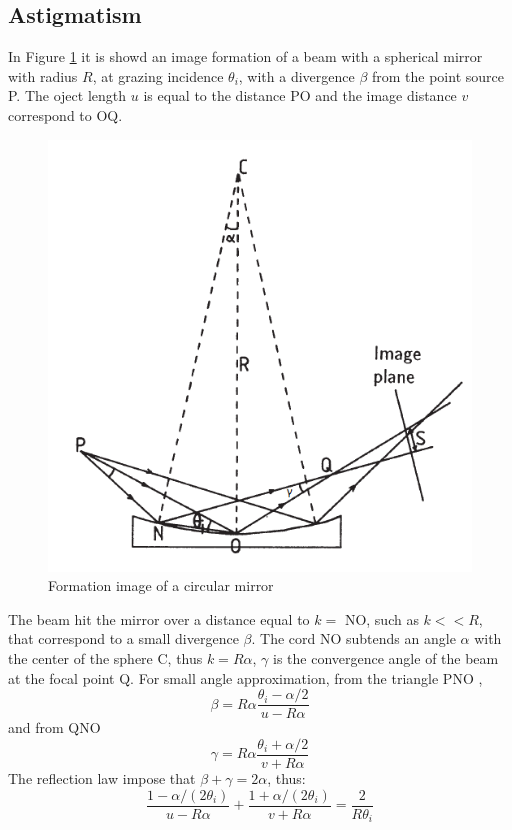 \subsection{Astigmatism}
In Figure \ref{fig: System1} it is showd an image formation of a beam with a spherical mirror with radius $R $, at grazing incidence $\theta_i $, with a divergence $\beta $ from the point source P. The oject length $u $ is equal to the distance PO and the image distance $v $ correspond to OQ.
\begin{figure}[]
%
\centering
%
\includegraphics[width=.6\textwidth]{Immagini/Chapter2/System1}
%
\caption{Formation image of a circular mirror}
%
\label{fig: System1}
%
\end{figure}
\noindent The beam hit the mirror over a distance equal to $k = $ NO, such as $k<<R $, that correspond to a small divergence $\beta $. The cord NO subtends an angle $\alpha $ with the center of the sphere C, thus $k = R \alpha $, $\gamma $ is the convergence angle of the beam at the focal point Q. For small angle approximation, from the triangle PNO ,
\begin{equation}
\beta = R \alpha \frac{\theta_i - \alpha / 2}{u - R \alpha}
\label{eq: beta}
\end{equation}
\noindent and from QNO
\begin{equation}
\gamma = R \alpha \frac{\theta_i + \alpha / 2}{v + R \alpha}
\label{eq: gamme}
\end{equation}
\noindent The reflection law impose that $\beta + \gamma = 2 \alpha$, thus:
\begin{equation}
\frac{1 - \alpha / (2 \theta_i)}{u - R \alpha} + \frac{1 + \alpha / (2 \theta_i)}{v + R \alpha} = \frac{2}{R \theta_i}
\label{eq: refle lae}
\end{equation}
